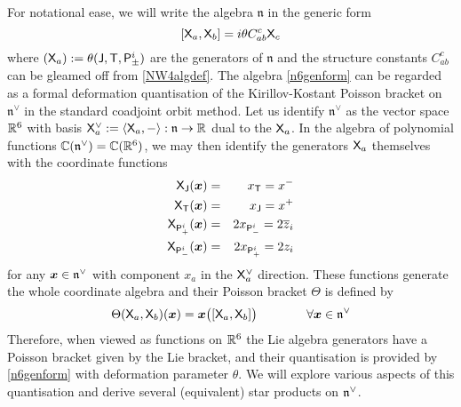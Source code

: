 For notational ease, we will write the algebra $\mathfrak{n}$ in the
generic form
\begin{equation}
  \label{n6genform}
  [{\sf X}_a,{\sf X}_b]= i \theta C_{ab}^{  c} {\sf X}_c  
\end{equation}
where $({\sf X}_a):=\theta ({\sf J},{\sf T},{\sf P}^i_\pm)$ are the generators of $\mathfrak{n}$ and
the structure constants $C_{ab}^{ c}$ can be gleamed off from \eqref{NW4algdef}.
The algebra \eqref{n6genform} can be regarded as a formal deformation
quantisation of the Kirillov-Kostant Poisson bracket on $\mathfrak{n}^\vee$ in
the standard coadjoint orbit method. Let us identify $\mathfrak{n}^\vee$ as the
vector space ${\mathbb R}^6$ with basis ${\sf X}_a^\vee:=\langle{\sf X}_a,-\rangle:{\mathfrak n}\to{\mathbb R}$ dual
to the ${\sf X}_a$. In the algebra of polynomial functions
${\mathbb C}(\mathfrak{n}^\vee)={\mathbb C}({\mathbb R}^6)$, we may then identify the generators ${\sf X}_a$
themselves with the coordinate functions
\begin{eqnarray}
  \label{Xacoordfns}
  {\sf X}_{\sf J}({{\boldsymbol {x} }})&=&x_{\sf T} = x^-   \nonumber\\ {\sf X}_{\sf T}({{\boldsymbol {x} }})
  &=&x_{\sf J} = x^+   \nonumber\\ 
  {\sf X}_{{\sf P}_+^i}({{\boldsymbol {x} }})&=&2x_{{\sf P}_-^i} = 2\overline{z}_i  
  \nonumber\\ {\sf X}_{{\sf P}_-^i}({{\boldsymbol {x} }})&=&2x_{{\sf P}_+^i} = 2z_i
\end{eqnarray}
for any ${{\boldsymbol {x} }}\in\mathfrak{n}^\vee$ with component $x_a$ in the ${\sf X}_a^\vee$
direction. These functions generate the whole coordinate algebra and their
Poisson bracket $\Theta$ is defined by
\begin{equation}
  \label{KKXadef}
  \Theta({\sf X}_a,{\sf X}_b)({{\boldsymbol {x} }})={{\boldsymbol {x} }}\bigl([{\sf X}_a,{\sf X}_b]\bigr)
  \qquad\qquad\forall{{\boldsymbol {x} }}\in\mathfrak{n}^\vee  
\end{equation}
Therefore, when viewed as functions on ${\mathbb R}^6$ the Lie algebra generators have
a Poisson bracket given by the Lie bracket, and their quantisation is provided
by \eqref{n6genform} with deformation parameter $\theta$. We will explore
various aspects of this quantisation and derive several (equivalent) star
products on ${\mathfrak n}^\vee$.

